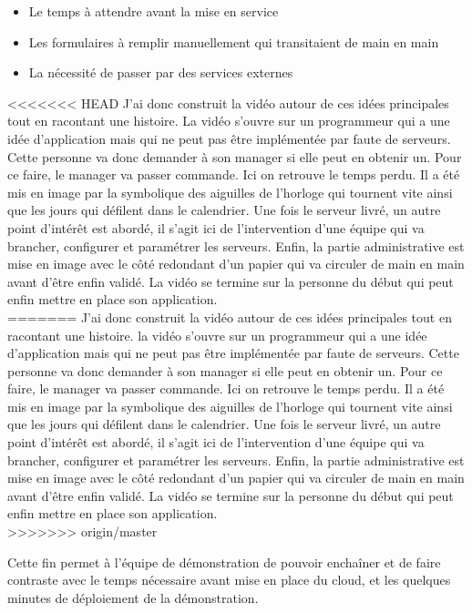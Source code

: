 \begin{itemize}
    \item Le temps à attendre avant la mise en service
    \item Les formulaires à remplir manuellement qui transitaient de main en main
    \item La nécessité de passer par des services externes
\end{itemize}

<<<<<<< HEAD
J'ai donc construit la vidéo autour de ces idées principales tout en racontant une histoire. La vidéo s'ouvre sur un programmeur qui a une idée d'application mais qui ne peut pas être implémentée par faute de serveurs. Cette personne va donc demander à son manager si elle peut en obtenir un. Pour ce faire, le manager va passer commande. Ici on retrouve le temps perdu. Il a été mis en image par la symbolique des aiguilles de l'horloge qui tournent vite ainsi que les jours qui défilent dans le calendrier. Une fois le serveur livré, un autre point d'intérêt est abordé, il s'agit ici de l'intervention d'une équipe qui va brancher, configurer et paramétrer les serveurs. Enfin, la partie administrative est mise en image avec le côté redondant d'un papier qui va circuler de main en main avant d'être enfin validé. La vidéo se termine sur la personne du début qui peut enfin mettre en place son application.\\
=======
J'ai donc construit la vidéo autour de ces idées principales tout en racontant une histoire. la vidéo s'ouvre sur un programmeur qui a une idée d'application mais qui ne peut pas être implémentée par faute de serveurs. Cette personne va donc demander à son manager si elle peut en obtenir un. Pour ce faire, le manager va passer commande. Ici on retrouve le temps perdu. Il a été mis en image par la symbolique des aiguilles de l'horloge qui tournent vite ainsi que les jours qui défilent dans le calendrier. Une fois le serveur livré, un autre point d'intérêt est abordé, il s'agit ici de l'intervention d'une équipe qui va brancher, configurer et paramétrer les serveurs. Enfin, la partie administrative est mise en image avec le côté redondant d'un papier qui va circuler de main en main avant d'être enfin validé. La vidéo se termine sur la personne du début qui peut enfin mettre en place son application.\\
>>>>>>> origin/master

Cette fin permet à l'équipe de démonstration de pouvoir enchaîner et de faire contraste avec le temps nécessaire avant mise en place du cloud, et les quelques minutes de déploiement de la démonstration.

